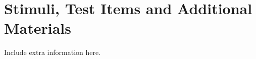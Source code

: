 \section{Stimuli, Test Items and Additional Materials}
\label{app:C}

\MAEindent

Include extra information here.